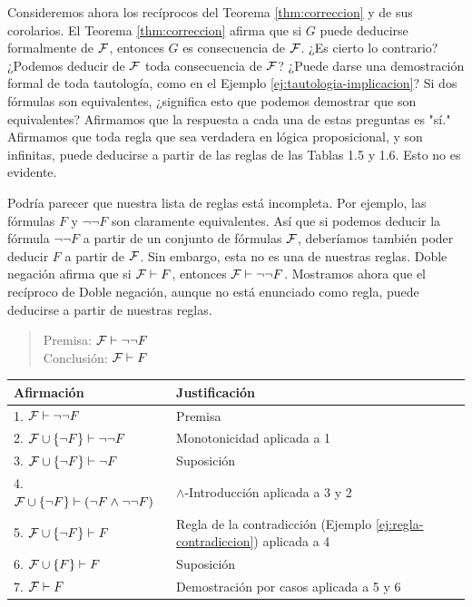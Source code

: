 \documentclass[12pt,a4paper]{book}
\makeatletter
\newcommand{\comillas}[1]{"#1"}
\newenvironment{derivacion}{%
  \begingroup
  \renewcommand{\arraystretch}{1.35}
  \begin{center}
  \begin{tabular}{@{}l l@{}}
    \textbf{Afirmación} & \textbf{Justificación}\\
    \hline
}{%
  \end{tabular}
  \end{center}
  \endgroup
}
\makeatother
\begin{document}
    Consideremos ahora los recíprocos del Teorema \ref{thm:correccion} y de sus corolarios. El Teorema \ref{thm:correccion}
    afirma que si $G$ puede deducirse formalmente de $\mathcal{F}$, entonces $G$ es consecuencia de $\mathcal{F}$. ¿Es cierto lo contrario?
    ¿Podemos deducir de $\mathcal{F}$ toda consecuencia de $\mathcal{F}$? ¿Puede darse una demostración formal de toda tautología, como en el
    Ejemplo \ref{ej:tautologia-implicacion}? Si dos fórmulas son equivalentes, ¿significa esto que podemos demostrar que son
    equivalentes? Afirmamos que la respuesta a cada una de estas preguntas es \comillas{sí.} Afirmamos que toda regla que sea
    verdadera en lógica proposicional, y son infinitas, puede deducirse a partir de las reglas de las Tablas 1.5 y 1.6. Esto no
    es evidente.

    \begin{ejemplo}\label{ej:doble-negacion-reciproco}
        Podría parecer que nuestra lista de reglas está incompleta. Por ejemplo, las fórmulas $F$ y $\neg\neg F$ son claramente
        equivalentes. Así que si podemos deducir la fórmula $\neg\neg F$ a partir de un conjunto de fórmulas $\mathcal{F}$, deberíamos
        también poder deducir $F$ a partir de $\mathcal{F}$. Sin embargo, esta no es una de nuestras reglas. Doble negación afirma que
        si $\mathcal{F}\vdash F$, entonces $\mathcal{F}\vdash\neg\neg F$. Mostramos ahora que el recíproco de Doble negación, aunque no está
        enunciado como regla, puede deducirse a partir de nuestras reglas.

        \begin{quote}
            Premisa: $\mathcal{F}\vdash\neg\neg F$\\
            Conclusión: $\mathcal{F}\vdash F$
        \end{quote}

        \begin{derivacion}
            1. $\mathcal{F}\vdash\neg\neg F$ & Premisa\\
            2. $\mathcal{F}\cup\{\neg F\}\vdash\neg\neg F$ & Monotonicidad aplicada a 1\\
            3. $\mathcal{F}\cup\{\neg F\}\vdash\neg F$ & Suposición\\
            4. $\mathcal{F}\cup\{\neg F\}\vdash(\neg F\wedge\neg\neg F)$ & $\wedge$-Introducción aplicada a 3 y 2\\
            5. $\mathcal{F}\cup\{\neg F\}\vdash F$ & Regla de la contradicción (Ejemplo \ref{ej:regla-contradiccion}) aplicada a 4\\
            6. $\mathcal{F}\cup\{F\}\vdash F$ & Suposición\\
            7. $\mathcal{F}\vdash F$ & Demostración por casos aplicada a 5 y 6\\
        \end{derivacion}
    \end{ejemplo}
\end{document}
